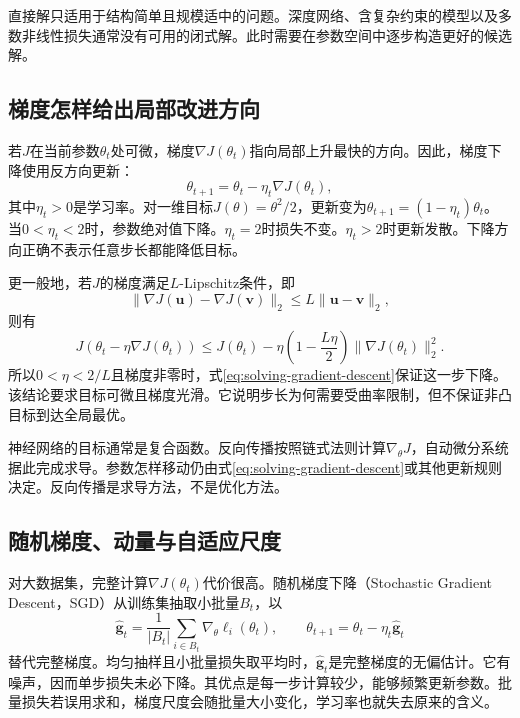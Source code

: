 直接解只适用于结构简单且规模适中的问题。深度网络、含复杂约束的模型以及多数非线性损失通常没有可用的闭式解。此时需要在参数空间中逐步构造更好的候选解。

\subsection{梯度怎样给出局部改进方向}
若$J$在当前参数$\theta_t$处可微，梯度$\nabla J(\theta_t)$指向局部上升最快的方向。因此，梯度下降使用反方向更新：
\begin{equation}
 \theta_{t+1}=\theta_t-\eta_t\nabla J(\theta_t),
 \label{eq:solving-gradient-descent}
\end{equation}
其中$\eta_t>0$是学习率。对一维目标$J(\theta)=\theta^2/2$，更新变为$\theta_{t+1}=(1-\eta_t)\theta_t$。当$0<\eta_t<2$时，参数绝对值下降。$\eta_t=2$时损失不变。$\eta_t>2$时更新发散。下降方向正确不表示任意步长都能降低目标。

更一般地，若$J$的梯度满足$L$-Lipschitz条件，即
\begin{equation}
 \|\nabla J(\bm u)-\nabla J(\bm v)\|_2\leq L\|\bm u-\bm v\|_2,
\end{equation}
则有
\begin{equation}
 J(\theta_t-\eta\nabla J(\theta_t))
 \leq J(\theta_t)-\eta\left(1-\frac{L\eta}{2}\right)
 \|\nabla J(\theta_t)\|_2^2.
 \label{eq:solving-descent-bound}
\end{equation}
所以$0<\eta<2/L$且梯度非零时，式\eqref{eq:solving-gradient-descent}保证这一步下降。该结论要求目标可微且梯度光滑。它说明步长为何需要受曲率限制，但不保证非凸目标到达全局最优。

神经网络的目标通常是复合函数。反向传播按照链式法则计算$\nabla_\theta J$，自动微分系统据此完成求导。参数怎样移动仍由式\eqref{eq:solving-gradient-descent}或其他更新规则决定。反向传播是求导方法，不是优化方法。

\subsection{随机梯度、动量与自适应尺度}
对大数据集，完整计算$\nabla J(\theta_t)$代价很高。随机梯度下降（Stochastic Gradient Descent，SGD）从训练集抽取小批量$B_t$，以
\begin{equation}
 \hat{\bm g}_t=\frac{1}{|B_t|}\sum_{i\in B_t}\nabla_\theta\ell_i(\theta_t),
 \qquad \theta_{t+1}=\theta_t-\eta_t\hat{\bm g}_t
 \label{eq:solving-sgd}
\end{equation}
替代完整梯度。均匀抽样且小批量损失取平均时，$\hat{\bm g}_t$是完整梯度的无偏估计。它有噪声，因而单步损失未必下降。其优点是每一步计算较少，能够频繁更新参数。批量损失若误用求和，梯度尺度会随批量大小变化，学习率也就失去原来的含义。

